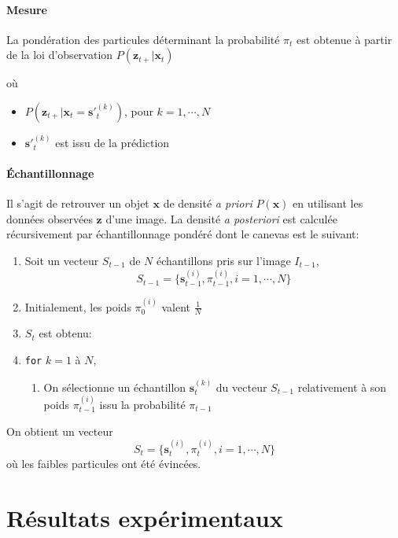 \documentclass[a4paper,11pt]{report}
\begin{document}
\subsubsection{Mesure}

La pondération des particules déterminant la probabilité $\pi_t$ est obtenue à partir de la loi d'observation $P(\mathbf{z}_{t+}|\mathbf{x}_{t})$ 

où
\begin{itemize}
\item[] $P(\mathbf{z}_{t+}|\mathbf{x}_{t} = \mathbf{s'}_{t}^{(k)})$, pour $k = 1,\cdots,N$
\item[] $\mathbf{s'}_{t}^{(k)}$ est issu de la prédiction
\end{itemize}
   

\subsubsection{Échantillonnage}
Il s'agit de retrouver un objet $\mathbf{x}$ de densité \textit{a priori} $P(\mathbf{x})$ en utilisant les données observées $\mathbf{z}$ d'une image.
La densité \textit{a posteriori} est calculée récursivement par échantillonnage pondéré dont le canevas est le suivant:
\begin{enumerate}
\item Soit un vecteur $S_{t-1}$ de $N$ échantillons pris sur l'image $I_{t-1}$,
$$S_{t-1}=\{ \mathbf{s}_{t-1}^{(i)}, \pi_{t-1}^{(i)}, i=1,\cdots,N\}$$
\item[] Initialement, les poids $\pi_0^{(i)}$ valent $\frac{1}{N}$ 
\item $S_t$ est obtenu:
\item[]\verb+for+ $k=1$ à $N$,
\begin{enumerate}
\item[] On sélectionne un échantillon $\mathbf{s}_t^{(k)}$ du vecteur $S_{t-1}$ relativement à son poids $\pi_{t-1}^{(i)}$ issu la probabilité $\pi_{t-1}$
\end{enumerate}
\end{enumerate} 

On obtient un vecteur $$S_{t}=\{ \mathbf{s}_{t}^{(i)}, \pi_{t}^{(i)}, i=1,\cdots,N\}$$ où les faibles particules ont été évincées.




\chapter{Résultats expérimentaux}
\end{document}
